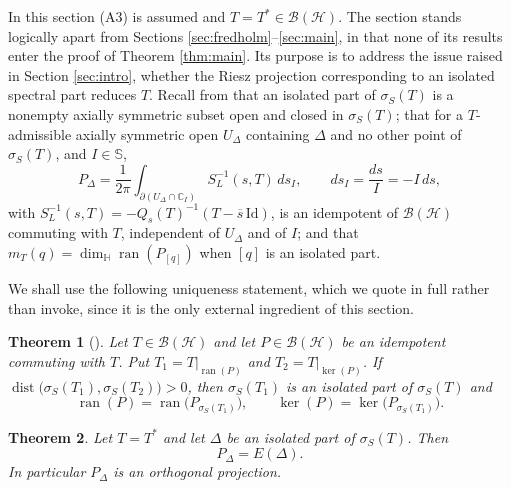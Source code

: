 \documentclass[12pt,a4paper]{article}
\theoremstyle{plain}
\newtheorem{theorem}{Theorem}[section]
\theoremstyle{definition}
\theoremstyle{remark}
\newcommand{\HH}{\mathbb H}
\newcommand{\CC}{\mathbb C}
\newcommand{\BB}{\mathcal B}
\newcommand{\Id}{\mathrm{Id}}
\newcommand{\HS}{\mathcal H}
\newcommand{\sphere}{\mathbb S}
\newcommand{\dimH}{\dim_{\HH}}
\newcommand{\sigS}{\sigma_S}
\DeclareMathOperator{\ran}{ran}
\DeclareMathOperator{\dist}{dist}
\begin{document}
{In this section (A3) is assumed and $T=T^*\in\BB(\HS)$. The
section stands logically apart from Sections
\ref{sec:fredholm}--\ref{sec:main}, in that none of its results enter
the proof of Theorem \ref{thm:main}. Its purpose is to address the
issue raised in Section \ref{sec:intro}, whether the Riesz projection
corresponding to an isolated spectral part reduces $T$. Recall from
\cite{BaloudiBelgacemJeribi2022,ColomboSabadiniStruppa2011,%
ColomboGantnerKimsey2018} that an isolated part of $\sigS(T)$
is a nonempty axially symmetric subset open and closed in $\sigS(T)$;
that for a $T$-admissible axially symmetric open $U_\Delta$ containing
$\Delta$ and no other point of $\sigS(T)$, and $I\in\sphere$,
\begin{equation}
 P_\Delta=\frac{1}{2\pi}\int_{\partial(U_\Delta\cap\CC_I)}
 S_L^{-1}(s,T)\,ds_I ,
 \qquad ds_I=\frac{ds}{I}=-I\,ds ,
 \label{eq:riesz}
\end{equation}
with $S_L^{-1}(s,T)=-Q_s(T)^{-1}(T-\overline s\,\Id)$, is an
idempotent of $\BB(\HS)$ commuting with $T$, independent of $U_\Delta$
and of $I$; and \cite[Definition 3.16]{BaloudiBelgacemJeribi2022} that
$m_T(q)=\dimH\ran(P_{[q]})$ when $[q]$ is an isolated part.

We shall use the following uniqueness statement, which we quote in
full rather than invoke, since it is the only external ingredient of
this section.

\begin{theorem}[{\cite[Theorem 3.6]{BaloudiBelgacemJeribi2022}}]
\label{thm:bbj36}
Let $T\in\BB(\HS)$ and let $P\in\BB(\HS)$ be an idempotent commuting
with $T$. Put $T_1=T|_{\ran(P)}$ and $T_2=T|_{\ker(P)}$. If
$\dist\big(\sigS(T_1),\sigS(T_2)\big)>0$, then $\sigS(T_1)$ is an
isolated part of $\sigS(T)$ and
\[
 \ran(P)=\ran\big(P_{\sigS(T_1)}\big),
 \qquad
 \ker(P)=\ker\big(P_{\sigS(T_1)}\big).
\]
\end{theorem}

\begin{theorem}
\label{thm:riesz}
Let $T=T^*$ and let $\Delta$ be an isolated part of $\sigS(T)$. Then
$$P_\Delta=E(\Delta).$$ In particular $P_\Delta$ is an orthogonal
projection.
\end{theorem}

}
\end{document}
